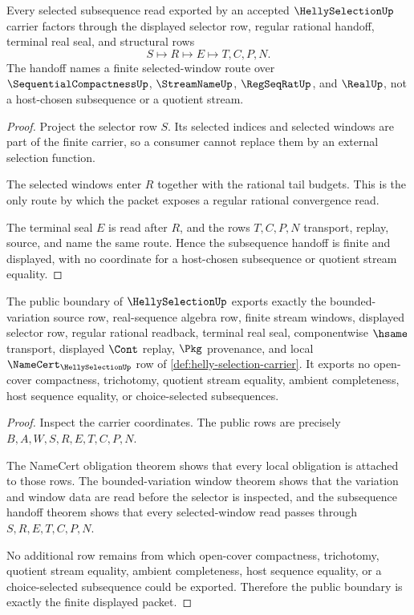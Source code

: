 \begin{theorem}\label{thm:helly-selection-subsequence-handoff}
Every selected subsequence read exported by an accepted $\HellySelectionUp$ carrier factors through the displayed selector row, regular rational handoff, terminal real seal, and structural rows
$$
S \longmapsto R \longmapsto E \longmapsto T,C,P,N.
$$
The handoff names a finite selected-window route over $\SequentialCompactnessUp$, $\StreamNameUp$, $\RegSeqRatUp$, and $\RealUp$, not a host-chosen subsequence or a quotient stream.
\end{theorem}
\begin{proof}
Project the selector row $S$. Its selected indices and selected windows are part of the finite carrier, so a consumer cannot replace them by an external selection function.

The selected windows enter $R$ together with the rational tail budgets. This is the only route by which the packet exposes a regular rational convergence read.

The terminal seal $E$ is read after $R$, and the rows $T,C,P,N$ transport, replay, source, and name the same route. Hence the subsequence handoff is finite and displayed, with no coordinate for a host-chosen subsequence or quotient stream equality.
\end{proof}

\begin{theorem}\label{thm:helly-selection-public-export}
The public boundary of $\HellySelectionUp$ exports exactly the bounded-variation source row, real-sequence algebra row, finite stream windows, displayed selector row, regular rational readback, terminal real seal, componentwise $\hsame$ transport, displayed $\Cont$ replay, $\Pkg$ provenance, and local $\NameCert_{\HellySelectionUp}$ row of \autoref{def:helly-selection-carrier}. It exports no open-cover compactness, trichotomy, quotient stream equality, ambient completeness, host sequence equality, or choice-selected subsequences.
\end{theorem}
\begin{proof}
Inspect the carrier coordinates. The public rows are precisely $B,A,W,S,R,E,T,C,P,N$.

The NameCert obligation theorem shows that every local obligation is attached to those rows. The bounded-variation window theorem shows that the variation and window data are read before the selector is inspected, and the subsequence handoff theorem shows that every selected-window read passes through $S,R,E,T,C,P,N$.

No additional row remains from which open-cover compactness, trichotomy, quotient stream equality, ambient completeness, host sequence equality, or a choice-selected subsequence could be exported. Therefore the public boundary is exactly the finite displayed packet.
\end{proof}

